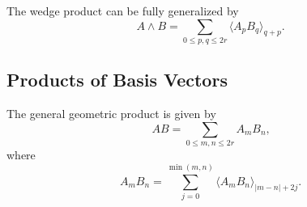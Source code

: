 \documentclass[aps, preprint]{revtex4}
\begin{document}
The wedge product can be fully generalized by
\begin{equation}A \wedge B =\sum _{0 \leq p ,q \leq 2 r} \langle A_{p} B_{q} \rangle _{q +p}\text{.}
\end{equation}

\subsection{Products of Basis Vectors}
The general geometric product is given by
\begin{equation}A B =\sum _{0 \leq m ,n \leq 2 r}A_{m} B_{n}\text{,}
\end{equation}where
\begin{equation}A_{m} B_{n} =\sum _{j =0}^{\min \left (m ,n\right )} \langle A_{m} B_{n} \rangle _{\left \vert m -n\right \vert  +2 j}\text{.}
\end{equation}
\end{document}
